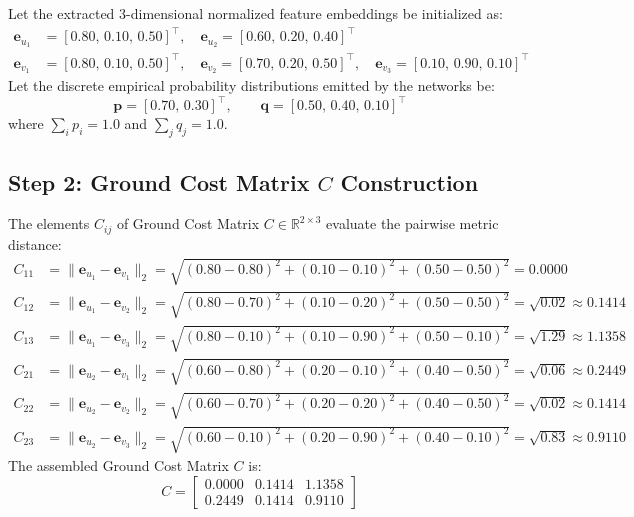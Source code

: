 Let the extracted 3-dimensional normalized feature embeddings be initialized as:
\begin{align}
    \mathbf{e}_{u_1} &= [0.80, \, 0.10, \, 0.50]^\top, \quad \mathbf{e}_{u_2} = [0.60, \, 0.20, \, 0.40]^\top \\
    \mathbf{e}_{v_1} &= [0.80, \, 0.10, \, 0.50]^\top, \quad \mathbf{e}_{v_2} = [0.70, \, 0.20, \, 0.50]^\top, \quad \mathbf{e}_{v_3} = [0.10, \, 0.90, \, 0.10]^\top
\end{align}
Let the discrete empirical probability distributions emitted by the networks be:
\begin{equation}
    \mathbf{p} = [0.70, \, 0.30]^\top, \qquad \mathbf{q} = [0.50, \, 0.40, \, 0.10]^\top
\end{equation}
where $\sum_i p_i = 1.0$ and $\sum_j q_j = 1.0$.

\subsection{Step 2: Ground Cost Matrix $C$ Construction}
The elements $C_{ij}$ of Ground Cost Matrix $C \in \mathbb{R}^{2 \times 3}$ evaluate the pairwise metric distance:
\begin{align}
    C_{11} &= \|\mathbf{e}_{u_1} - \mathbf{e}_{v_1}\|_2 = \sqrt{(0.80-0.80)^2 + (0.10-0.10)^2 + (0.50-0.50)^2} = \mathbf{0.0000} \\
    C_{12} &= \|\mathbf{e}_{u_1} - \mathbf{e}_{v_2}\|_2 = \sqrt{(0.80-0.70)^2 + (0.10-0.20)^2 + (0.50-0.50)^2} = \sqrt{0.02} \approx \mathbf{0.1414} \\
    C_{13} &= \|\mathbf{e}_{u_1} - \mathbf{e}_{v_3}\|_2 = \sqrt{(0.80-0.10)^2 + (0.10-0.90)^2 + (0.50-0.10)^2} = \sqrt{1.29} \approx \mathbf{1.1358} \\
    C_{21} &= \|\mathbf{e}_{u_2} - \mathbf{e}_{v_1}\|_2 = \sqrt{(0.60-0.80)^2 + (0.20-0.10)^2 + (0.40-0.50)^2} = \sqrt{0.06} \approx \mathbf{0.2449} \\
    C_{22} &= \|\mathbf{e}_{u_2} - \mathbf{e}_{v_2}\|_2 = \sqrt{(0.60-0.70)^2 + (0.20-0.20)^2 + (0.40-0.50)^2} = \sqrt{0.02} \approx \mathbf{0.1414} \\
    C_{23} &= \|\mathbf{e}_{u_2} - \mathbf{e}_{v_3}\|_2 = \sqrt{(0.60-0.10)^2 + (0.20-0.90)^2 + (0.40-0.10)^2} = \sqrt{0.83} \approx \mathbf{0.9110}
\end{align}
The assembled Ground Cost Matrix $C$ is:
\begin{equation}
    C = \begin{bmatrix}
        0.0000 & 0.1414 & 1.1358 \\
        0.2449 & 0.1414 & 0.9110
    \end{bmatrix}
\end{equation}

